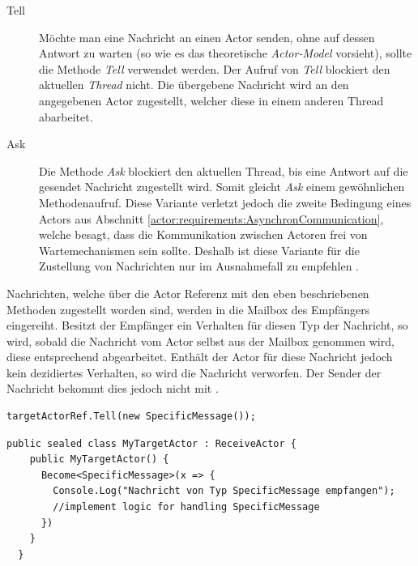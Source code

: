 \begin{description}
  \item[Tell] Möchte man eine Nachricht an einen Actor senden, ohne auf dessen Antwort zu warten (so wie es das theoretische \textit{ Actor-Model} vorsieht), sollte die Methode \textit{Tell} verwendet werden. Der Aufruf von \textit{Tell} blockiert den aktuellen \textit{Thread} nicht. Die übergebene Nachricht wird an den angegebenen Actor zugestellt, welcher diese in einem anderen Thread abarbeitet. 
  \item[Ask] Die Methode \textit{Ask} blockiert den aktuellen Thread, bis eine Antwort auf die gesendet Nachricht zugestellt wird. Somit gleicht \textit{Ask} einem gewöhnlichen Methodenaufruf. Diese Variante verletzt jedoch die zweite Bedingung eines Actors aus Abschnitt \ref{actor:requirements:AsynchronCommunication}, welche besagt, dass die Kommunikation zwischen Actoren frei von Wartemechanismen sein sollte. Deshalb ist diese Variante für die Zustellung von Nachrichten nur im Ausnahmefall zu empfehlen \citep{Akka.netCommunityAkka.NETDocumentation}. 
\end{description}
Nachrichten, welche über die Actor Referenz mit den eben beschriebenen Methoden zugestellt worden sind, werden in die Mailbox des Empfängers eingereiht. Besitzt der Empfänger ein Verhalten für diesen Typ der Nachricht, so wird, sobald die Nachricht vom Actor selbst aus der Mailbox genommen wird, diese entsprechend abgearbeitet. Enthält der Actor für diese Nachricht jedoch kein de­zi­diertes Verhalten, so wird die Nachricht verworfen. Der Sender der Nachricht bekommt dies jedoch nicht mit \citep{akkaInAction}. 

\begin{lstlisting}[caption=Versenden einer Nachricht an einen anderen Actor, label=code:actor:TellMethod]
  targetActorRef.Tell(new SpecificMessage());
\end{lstlisting}

\begin{lstlisting}[caption=Hier wird für den Actor \textit{MyTargetActor} das Verhalten für eine einkommende Nachricht vom Typ \textit{SpecificMessage} festgelegt., label=lst:test]
  public sealed class MyTargetActor : ReceiveActor {
    public MyTargetActor() {
      Become<SpecificMessage>(x => {
        Console.Log("Nachricht von Typ SpecificMessage empfangen");
        //implement logic for handling SpecificMessage
      })
    }
  }  
\end{lstlisting}

